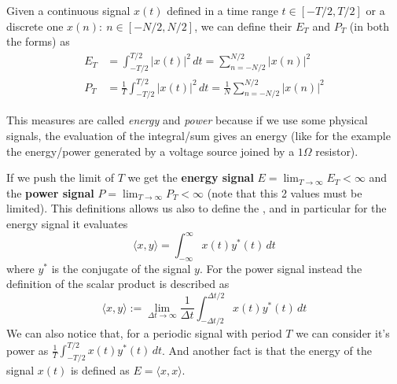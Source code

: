 	Given a continuous signal $x(t)$ defined in a time range $t\in [-T/2, T/2]$ or a discrete one $x(n):\ n \in [-N/2,N/2]$, we can define their  $E_T$ and  $P_T$ (in both the forms) as
	\begin{equation}
	\begin{split}		
		E_T & = \int_{-T/2}^{T/2} |x(t)|^2 \, dt = \sum_{n=-N/2}^{N/2} |x(n)|^2 \\
		P_T & = \frac 1 T\int_{-T/2}^{T/2} |x(t)|^2 \, dt = \frac 1 N \sum_{n=-N/2}^{N/2} |x(n)|^2
	\end{split}
	\end{equation}
	
	This measures are called \textit{energy} and \textit{power} because if we use some physical signals, the evaluation of the integral/sum gives an energy (like for the example the energy/power generated by a voltage source joined by a $1\Omega$ resistor). 
	
	If we push the limit of $T$ we get the \textbf{energy signal} $E = \lim_{T\rightarrow \infty} E_T < \infty$ and the \textbf{power signal} $P = \lim_{T\rightarrow \infty} P_T < \infty$ (note that this 2 values must be limited). This definitions allows us also to define the , and in particular for the energy signal it evaluates
	\begin{equation}
		\langle x,y\rangle = \int_{-\infty}^\infty x(t) y^*(t)\, dt
	\end{equation}
	where $y^*$ is the conjugate of the signal $y$. For the power signal instead the definition of the scalar product is described as
	\begin{equation}
		\langle x, y\rangle := \lim_{\Delta t \rightarrow \infty} \frac{1}{\Delta t} \int_{-\Delta t/2}^{\Delta t/2} x(t)y^*(t) \, dt
	\end{equation}
	We can also notice that, for a periodic signal with period $T$ we can consider it's power as $ \frac{1}{T} \int_{-T/2}^{T/2} x(t)y^*(t) \, dt$. And another fact is that the energy of the signal $x(t)$ is defined as $E= \langle x,x \rangle$.
	